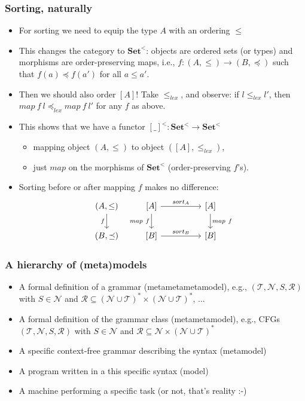 \documentclass[handout]{beamer}
\newcommand{\bfsf}[1]{{\boldsymbol{#1}}}
\newcommand{\Set}{\bfsf{Set}}
\begin{document}
\frame
  {   
    \frametitle{Sorting, naturally}\label{Ch3:sorting}

 \begin{itemize}[<+->]
\item For sorting we need to equip the type $A$ with an ordering $\leq$
\item This changes the category to $\Set^{<}$: objects are ordered sets (or types) and
morphisms are order-preserving maps, i.e., $f: (A,\leq)\to (B,\preceq)$ 
such that $f(a)\preceq f(a')$ for all $a\leq a'$. 
\item Then we should also order $[A]$! Take $\leq_{lex}$, and observe:
if $l \leq_{lex} l'$, then $map~f~l \preceq_{lex} map~f~l'$ for any $f$ as above.
\item This shows that we have a functor $[\_]^{<} : \Set^{<} \to \Set^{<}$
   \begin{itemize}[<+->]
\item mapping object $(A,\leq)$ to object $([A],\leq_{lex})$, 
\item just $map$ on the morphisms of $\Set^{<}$ (order-preserving $f$'s).
   \end{itemize}
\item Sorting before or after mapping $f$ makes no difference:
\[
\begin{tikzcd}[ampersand replacement=\&]
(A,\leq) \arrow[swap]{d}{f} \& {[A]}  \arrow[swap]{d}{map~f}\arrow{rr}{sort_A} \&\& {[A]}\arrow{d}{map~f}\\
(B,\preceq) \& {[B]}  \arrow{rr}{sort_B}\& \& {[B]}
\end{tikzcd}
\]
 \end{itemize}

 }


\frame
  {   
    \frametitle{A hierarchy of (meta)models}\label{Ch3:metameta}

 \begin{itemize}[<+->]
\item A formal definition of a grammar (metametametamodel), e.g.,
$(\mathcal T, \mathcal N, S, \mathcal R)$ with $S\in\mathcal N$ and
$\mathcal R \subseteq(\mathcal N \cup\mathcal T)^* \times (\mathcal N \cup\mathcal T)^*$, ...
\item A formal definition of the grammar class (metametamodel), e.g., CFGs
$(\mathcal T, \mathcal N, S, \mathcal R)$ with $S\in\mathcal N$ and
$\mathcal R \subseteq\mathcal N \times (\mathcal N \cup\mathcal T)^*$
\item A specific context-free grammar describing the syntax (metamodel)
\item A program written in a this specific syntax (model)
\item A machine performing a specific task (or not, that's reality :-)
 \end{itemize}

 }
\end{document}
